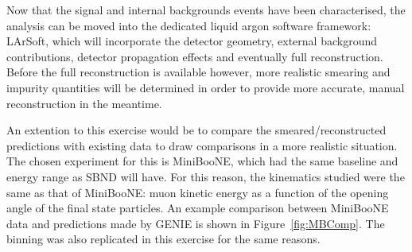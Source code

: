 Now that the signal and internal backgrounds events have been characterised, the analysis can be moved into the dedicated liquid argon software framework: LArSoft, which will incorporate the detector geometry, external background contributions, detector propagation effects and eventually full reconstruction. Before the full reconstruction is available however, more realistic smearing and impurity quantities will be determined in order to provide more accurate, manual reconstruction in the meantime.  

An extention to this exercise would be to compare the smeared/reconstructed predictions with existing data to draw comparisons in a more realistic situation. The chosen experiment for this is MiniBooNE, which had the same baseline and energy range as SBND will have. For this reason, the kinematics studied were the same as that of MiniBooNE: muon kinetic energy as a function of the opening angle of the final state particles. An example comparison between
MiniBooNE data and predictions made by GENIE is shown in Figure~\ref{fig:MBComp}. The binning was also replicated in this exercise for the same reasons.

\clearpage
